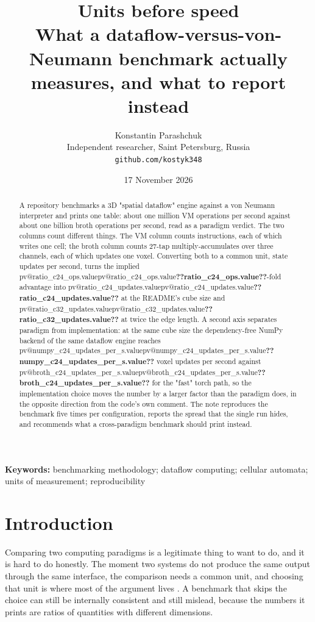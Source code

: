\documentclass[11pt,a4paper]{article}
\title{\bfseries Units before speed\\[2pt]
\large What a dataflow-versus-von-Neumann benchmark actually measures, and what to report instead}
\author{Konstantin Parashchuk\\\small Independent researcher, Saint Petersburg, Russia\\
\small \texttt{github.com/kostyk348}}
\date{17 November 2026}
\makeatletter
\newcommand{\val}[1]{\ifcsname pv@#1\endcsname\csname pv@#1\endcsname\else\textbf{??#1??}\fi}
\makeatother
\begin{document}
\maketitle

\begin{abstract}
\noindent
A repository benchmarks a 3D "spatial dataflow" engine against a von Neumann interpreter and
prints one table: about one million VM operations per second against about one billion broth
operations per second, read as a paradigm verdict. The two columns count different things. The VM
column counts instructions, each of which writes one cell; the broth column counts 27-tap
multiply-accumulates over three channels, each of which updates one voxel. Converting both to a
common unit, state updates per second, turns the implied
\val{ratio_c24_ops.value}-fold advantage into \val{ratio_c24_updates.value} at the README's cube
size and \val{ratio_c32_updates.value} at twice the edge length. A second axis separates paradigm
from implementation: at the same cube size the dependency-free NumPy backend of the same dataflow
engine reaches \val{numpy_c24_updates_per_s.value} voxel updates per second against
\val{broth_c24_updates_per_s.value} for the "fast" torch path, so the implementation choice moves
the number by a larger factor than the paradigm does, in the opposite direction from the code's
own comment. The note reproduces the benchmark five times per configuration, reports the spread
that the single run hides, and recommends what a cross-paradigm benchmark should print instead.
\end{abstract}

\noindent\textbf{Keywords:} benchmarking methodology; dataflow computing; cellular automata;
units of measurement; reproducibility

\section{Introduction}

Comparing two computing paradigms is a legitimate thing to want to do, and it is hard to do
honestly. The moment two systems do not produce the same output through the same interface, the
comparison needs a common unit, and choosing that unit is where most of the argument lives
\citep{hoefler2015,amdahl1967}. A benchmark that skips the choice can still be internally
consistent and still mislead, because the numbers it prints are ratios of quantities with
different dimensions.
\end{document}
